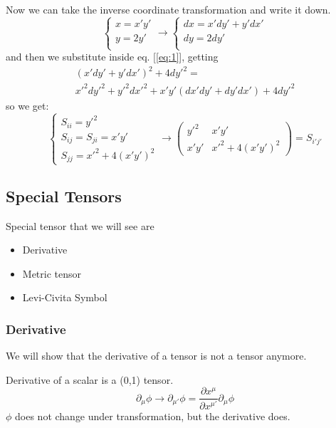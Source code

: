 Now we can take the inverse coordinate transformation and write it down.
\begin{equation}
\begin{cases}
x = x'y' \\
 y = 2y'\\
\end{cases} \to 
\begin{cases}
dx = x'dy' + y'dx' \\
dy = 2dy' \\
\end{cases}
\end{equation}
and then we substitute inside eq. [\ref{eq:1}], getting
\begin{gather*}
	\left( x'dy' + y'dx' \right)^{2} + 4dy'^{2} = \\
	x'^{2}dy'^{2} + y'^{2}dx'^{2} + x'y'\left( dx'dy'+dy'dx' \right) + 4dy'^{2} 
\end{gather*}
so we get:
\begin{equation}
\begin{cases}
S_{ii} = y'^{2} \\
S_{ij} = S_{ji} = x'y' \\
S_{jj} = x'^{2} + 4\left( x'y' \right)^{2}
\end{cases}
\to 
\begin{pmatrix}
y'^{2} & x'y' \\
x'y' & x'^{2}+4\left( x'y' \right)^{2}
\end{pmatrix} = S_{i'j'} 
\end{equation}

\subsection{Special Tensors}
Special tensor that we will see are
\begin{itemize}
	\item Derivative
	\item Metric tensor
	\item Levi-Civita Symbol
\end{itemize}

\subsubsection{Derivative}
We will show that the derivative of a tensor is not a tensor anymore.\par

Derivative of a scalar is a (0,1) tensor.
\[
\partial_{\mu }\phi \to \partial_{\mu '}\phi = \frac{\partial x^{\mu }}{\partial x^{\mu '}} \partial_{\mu }\phi 
\]
$\phi $ does not change under transformation, but the derivative does.

